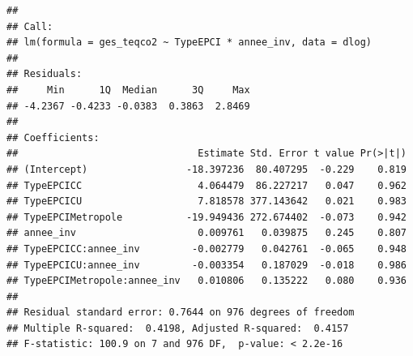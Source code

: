 \documentclass[
]{article}
\newenvironment{Shaded}{\begin{snugshade}}{\end{snugshade}}
\newcommand{\AttributeTok}[1]{\textcolor[rgb]{0.13,0.29,0.53}{#1}}
\newcommand{\DecValTok}[1]{\textcolor[rgb]{0.00,0.00,0.81}{#1}}
\newcommand{\FunctionTok}[1]{\textcolor[rgb]{0.13,0.29,0.53}{\textbf{#1}}}
\newcommand{\NormalTok}[1]{#1}
\newcommand{\OtherTok}[1]{\textcolor[rgb]{0.56,0.35,0.01}{#1}}
\newcommand{\SpecialCharTok}[1]{\textcolor[rgb]{0.81,0.36,0.00}{\textbf{#1}}}
\newcommand{\StringTok}[1]{\textcolor[rgb]{0.31,0.60,0.02}{#1}}
\begin{document}
\begin{Shaded}
\end{Shaded}

\begin{verbatim}
## 
## Call:
## lm(formula = ges_teqco2 ~ TypeEPCI * annee_inv, data = dlog)
## 
## Residuals:
##     Min      1Q  Median      3Q     Max 
## -4.2367 -0.4233 -0.0383  0.3863  2.8469 
## 
## Coefficients:
##                               Estimate Std. Error t value Pr(>|t|)
## (Intercept)                 -18.397236  80.407295  -0.229    0.819
## TypeEPCICC                    4.064479  86.227217   0.047    0.962
## TypeEPCICU                    7.818578 377.143642   0.021    0.983
## TypeEPCIMetropole           -19.949436 272.674402  -0.073    0.942
## annee_inv                     0.009761   0.039875   0.245    0.807
## TypeEPCICC:annee_inv         -0.002779   0.042761  -0.065    0.948
## TypeEPCICU:annee_inv         -0.003354   0.187029  -0.018    0.986
## TypeEPCIMetropole:annee_inv   0.010806   0.135222   0.080    0.936
## 
## Residual standard error: 0.7644 on 976 degrees of freedom
## Multiple R-squared:  0.4198, Adjusted R-squared:  0.4157 
## F-statistic: 100.9 on 7 and 976 DF,  p-value: < 2.2e-16
\end{verbatim}
\end{document}
